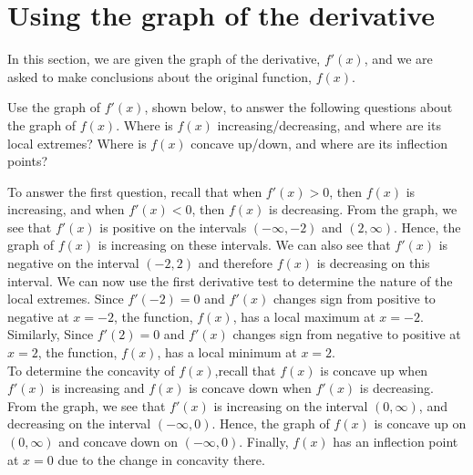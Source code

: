 \documentclass[handout]{ximera}
\begin{document}
\section{Using the graph of the derivative}
In this section, we are given the graph of the derivative, $f'(x)$, and we are 
asked to make conclusions about the original function, $f(x)$.

\begin{example}[example 9]
Use the graph of $f'(x)$, shown below, to answer the following questions about the graph of $f(x)$.
Where is $f(x)$ increasing/decreasing, and where are its local extremes?
Where is $f(x)$ concave up/down, and where are its inflection points?

\begin{image}
\end{image}

To answer the first question, recall that when $f'(x) > 0$, then $f(x)$ is increasing,
and when $f'(x) < 0$, then $f(x)$ is decreasing.  From the graph, we see that $f'(x)$ is 
positive on the intervals 
$(-\infty, -2)$ and $(2, \infty)$.  Hence, the graph of $f(x)$ is increasing on 
these intervals. We can also see that 
$f'(x)$ is negative on the interval $(-2, 2)$ and therefore $f(x)$ is decreasing on this interval.
We can now use the first derivative test to determine the nature of the local extremes. 
Since $f'(-2) = 0$ and $f'(x)$
changes sign from positive to negative at $x = -2$, the function, $f(x)$, has a 
local maximum at $x = -2$.
Similarly, Since $f'(2) = 0$ and $f'(x)$
changes sign from negative to positive at $x = 2$, the function, $f(x)$, has a 
local minimum at $x = 2$.\\
To determine the concavity of $f(x)$,recall that $f(x)$ is concave up when $f'(x)$ is 
increasing and $f(x)$
is concave down when $f'(x)$ is decreasing.  From the graph, we see that $f'(x)$ is 
increasing on the interval $(0, \infty)$,
and decreasing on the interval $(-\infty, 0)$. Hence, the graph of $f(x)$ is 
concave up on $(0, \infty)$
and concave down on $(-\infty, 0)$.  Finally, $f(x)$ has an inflection 
point at $x = 0$ due to the change in concavity there.


\end{example}
\end{document}
